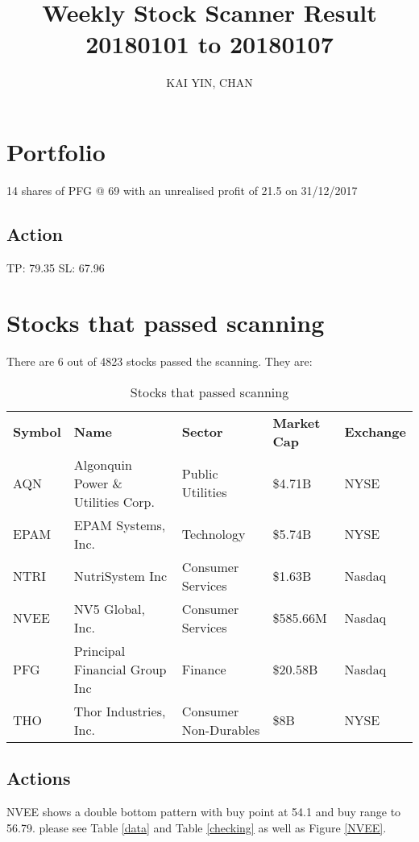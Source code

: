 \documentclass{article}
\begin{document}
\title{Weekly Stock Scanner Result \\ 20180101 to 20180107}
\author{KAI YIN, CHAN}
\maketitle

\section{Portfolio}
14 shares of PFG @ 69 with an unrealised profit of 21.5 on 31/12/2017

\subsection{Action}
TP: 79.35 SL: 67.96

\section{Stocks that passed scanning}

There are 6 out of 4823 stocks passed the scanning.  They are:
\begin{table}[htbp]
  \caption{Stocks that passed scanning}
    \begin{tabular}{lllll}
    	\textbf{Symbol} & \textbf{Name} & \textbf{Sector} & \textbf{Market Cap} & \textbf{Exchange} \\
    	AQN   & Algonquin Power \& Utilities Corp. & Public Utilities & \$4.71B & NYSE \\
    	EPAM  & EPAM Systems, Inc. & Technology & \$5.74B & NYSE \\
    	NTRI  & NutriSystem Inc & Consumer Services & \$1.63B & Nasdaq \\
    	NVEE  & NV5 Global, Inc. & Consumer Services & \$585.66M & Nasdaq \\
    	PFG   & Principal Financial Group Inc & Finance & \$20.58B & Nasdaq \\
    	THO   & Thor Industries, Inc. & Consumer Non-Durables & \$8B  & NYSE \\
    \end{tabular}%
    \label{tab:addlabel}%
\end{table}%

\subsection{Actions}
NVEE shows a double bottom pattern with buy point at 54.1 and buy range to 56.79. please see Table \ref{data} and Table \ref{checking} as well as Figure \ref{NVEE}.
\end{document}

